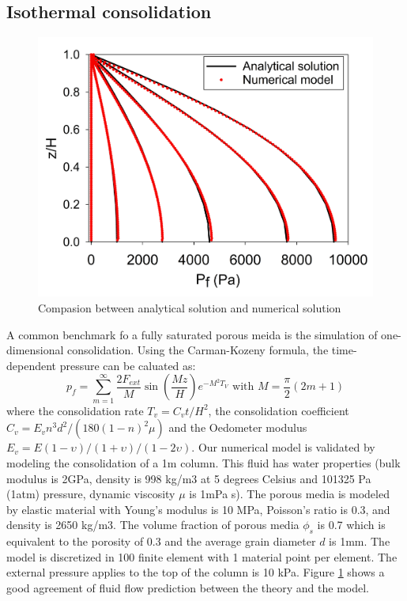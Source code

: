 \documentclass[preprint,12pt]{elsarticle}
\begin{document}
\subsection{\textsf{Isothermal consolidation}}
%
%
\begin{figure}[h]
\center
\includegraphics[scale=.3]{consolidation.jpg}
\caption{Compasion between analytical solution and numerical solution}
\label{fig:consolidation}
\end {figure}
%
%
A common benchmark fo a fully saturated porous meida is the simulation of one-dimensional consolidation. Using the Carman-Kozeny formula, the time-dependent pressure can be caluated as:
%
%
\begin{equation}
  p_f  = \sum_{m=1}^{\infty} \frac{2F_{ext}}{M} \sin (\frac{Mz}{H}) e^{-M^2T_V} \textrm{    with    }   M = \frac{\pi}{2} (2m+1)
\end {equation}
%
%
where the consolidation rate $T_v =C_vt/H^2$, the consolidation coefficient $C_v = E_v n^3 d^2/(180(1-n)^2\mu) $ and the Oedometer modulus $E_v = E(1-\upsilon)/(1+\upsilon)/(1-2\upsilon)$.
Our numerical model is validated by modeling the consolidation of a 1m column. This fluid has water properties (bulk modulus is 2GPa, density is 998 kg/m3 at 5 degrees Celsius and 101325 Pa (1atm) pressure, dynamic viscosity $\mu$ is 1mPa s). The porous media is modeled by elastic material with Young's modulus is 10 MPa, Poisson's ratio is 0.3, and density is 2650 kg/m3. The volume fraction of porous media $\phi_s$ is 0.7 which is equivalent to the porosity of 0.3 and the average grain diameter $d$ is 1mm. The model is discretized in 100 finite element with 1 material point per element. The external pressure applies to the top of the column is 10 kPa. Figure \ref{fig:consolidation} shows a good agreement of fluid flow prediction between the theory and the model. \\
\end{document}
